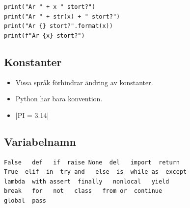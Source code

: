 \begin{frame}[fragile]
  \begin{example}
    \begin{verbatim}
print("Ar " + x " stort?")
print("Ar " + str(x) + " stort?")
print("Ar {} stort?".format(x))
print(f"Ar {x} stort?")
    \end{verbatim}
  \end{example}
\end{frame}


\subsection{Konstanter}

\begin{frame}
  \begin{remark}
    \begin{itemize}
      \item Vissa språk förhindrar ändring av konstanter.
      \item Python har bara konvention.
      \item {}|PI = 3.14|
    \end{itemize}
  \end{remark}
\end{frame}


\subsection{Variabelnamn}

\begin{frame}[fragile]
  \begin{remark}
    \begin{verbatim}
False   def   if  raise None  del   import  return
True  elif  in  try and   else  is  while as  except
lambda  with assert  finally   nonlocal   yield
break   for   not   class   from or  continue
global  pass
    \end{verbatim}
  \end{remark}
\end{frame}
